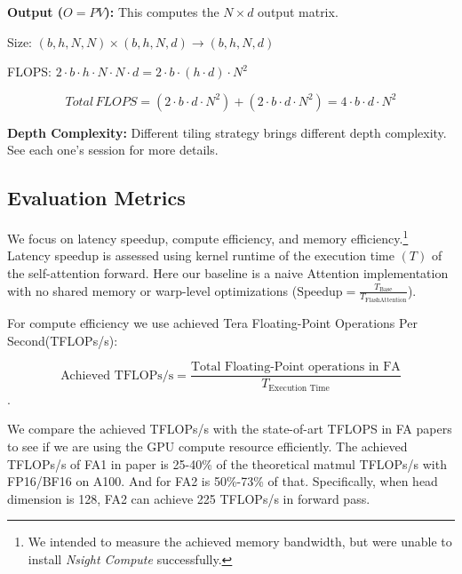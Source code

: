 \documentclass[11pt]{article}
\renewcommand\cite{\citep}  %
\begin{document}
\textbf{Output ($O = PV$):} This computes the $N \times d$ output matrix.

Size: $(b, h, N, N) \times (b, h, N, d) \rightarrow (b, h, N, d)$

FLOPS: $2 \cdot b \cdot h \cdot N \cdot N \cdot d = 2 \cdot b \cdot (h \cdot d) \cdot N^2$

$$ Total\, FLOPS = (2 \cdot b \cdot d \cdot N^2) + (2 \cdot b \cdot d \cdot N^2) = 4 \cdot b \cdot d \cdot N^2 $$


\textbf{Depth Complexity: } Different tiling strategy brings different depth complexity. See each one's session for more details.


\subsection{Evaluation Metrics}
We focus on latency speedup, compute efficiency, and memory efficiency.\footnote{We intended to measure the achieved memory bandwidth, but were unable to install \textit{Nsight Compute} successfully.} Latency speedup is assessed using kernel runtime of the execution time $(T)$ of the self-attention forward. Here our baseline is a naive Attention implementation with no shared memory or warp-level optimizations ($\text{Speedup} = \frac{T_{\text{Base}}}{T_{\text{FlashAttention}}}$).

For compute efficiency we use achieved Tera Floating-Point Operations Per Second(TFLOPs/s): 

$$\text{Achieved TFLOPs/s} = \frac{\text{Total Floating-Point operations in FA}}{T_{\text{Execution Time}}}$$.

We compare the achieved TFLOPs/s with the state-of-art TFLOPS in FA papers to see if we are using the GPU compute resource efficiently. The achieved TFLOPs/s of FA1 in paper is 25-40\% of the theoretical matmul TFLOPs/s with FP16/BF16 on A100. And for FA2 is 50\%-73\% of that\cite{dao2023flashattention}. Specifically, when head dimension is 128, FA2 can achieve 225 TFLOPs/s in forward pass.

\end{document}
